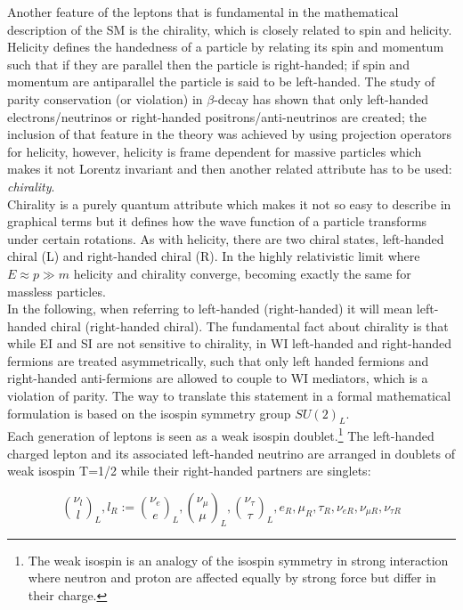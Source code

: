 \noindent Another feature of the leptons that is fundamental in the mathematical description of the SM is the chirality, which is closely related to spin and helicity. Helicity defines the handedness of a particle by relating its spin and momentum such that if they are parallel then the particle is right-handed; if spin and momentum are antiparallel the particle is said to be left-handed. The study of parity conservation (or violation) in $\beta$-decay has shown that only left-handed electrons/neutrinos or right-handed positrons/anti-neutrinos are created\cite{goldhaber}; the inclusion of that feature in the theory was achieved by using projection operators for helicity, however, helicity is frame dependent for massive particles which makes it not Lorentz invariant and then another related attribute has to be used: \textit{chirality}.\\

\noindent Chirality is a purely quantum attribute which makes it not so easy to describe in graphical terms but it defines how the wave function of a particle transforms under certain rotations. As with helicity, there are two chiral states, left-handed chiral (L) and right-handed chiral (R). In the highly relativistic limit where $E\approx p \gg m$ helicity and chirality converge, becoming exactly the same for massless particles.\\

\noindent In the following, when referring to left-handed (right-handed) it will mean left-handed chiral (right-handed chiral). The fundamental fact about chirality is that while EI and SI are not sensitive to chirality, in WI left-handed and right-handed fermions are treated asymmetrically, such that only left handed fermions and right-handed anti-fermions are allowed to couple to WI mediators, which is a violation of parity. The way to translate this statement in a formal mathematical formulation is based on the isospin symmetry group $SU(2)_L$.\\   

\noindent Each generation of leptons is seen as a weak isospin doublet.\footnote{The weak isospin is an analogy of the isospin symmetry in strong interaction where neutron and proton are affected equally by strong force but differ in their charge.} The left-handed charged lepton and its associated left-handed neutrino are arranged in doublets of weak isospin T=1/2 while their right-handed partners are singlets:

\begin{equation}
\binom{\nu_l}{l}_L , l_R := \binom{\nu_e}{e}_L , \binom{\nu_\mu}{\mu}_L, \binom{\nu_\tau}{\tau}_L, e_R, \mu_R, \tau_R, \nu_{eR}, \nu_{\mu R}, \nu_{\tau R}
\label{lepton_multiplets}
\end{equation}

